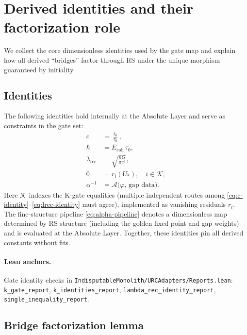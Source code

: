 \documentclass[11pt]{article}
\begin{document}
\section{Derived identities and their factorization role}
We collect the core dimensionless identities used by the gate map and explain how all derived ``bridges'' factor through RS under the unique morphism guaranteed by initiality.

\subsection{Identities}
The following identities hold internally at the Absolute Layer and serve as constraints in the gate set:
\begin{align}
  c &= \frac{\ell_0}{\tau_0}, \label{eq:c-identity} \\
  \hbar &= E_{\mathrm{coh}}\,\tau_0, \label{eq:hbar-identity} \\
  \lambda_{\mathrm{rec}} &= \sqrt{\frac{\hbar G}{\pi c^3}}, \label{eq:lrec-identity} \\
  0 &= r_i(U_*), \quad i\in\mathcal{K}, \label{eq:kgates-zero} \\
  \alpha^{-1} &= \mathcal{A}\bigl(\varphi,\,\text{gap data}\bigr). \label{eq:alpha-pipeline}
\end{align}
Here \(\mathcal{K}\) indexes the K\mbox{-}gate equalities (multiple independent routes among \eqref{eq:c-identity}--\eqref{eq:lrec-identity} must agree), implemented as vanishing residuals \(r_i\). The fine\mbox{-}structure pipeline \eqref{eq:alpha-pipeline} denotes a dimensionless map determined by RS structure (including the golden fixed point and gap weights) and is evaluated at the Absolute Layer. Together, these identities pin all derived constants without fits.

\paragraph{Lean anchors.} Gate identity checks in \texttt{IndisputableMonolith/URCAdapters/Reports.lean}: \texttt{k\_gate\_report}, \texttt{k\_identities\_report}, \texttt{lambda\_rec\_identity\_report}, \texttt{single\_inequality\_report}.

\subsection{Bridge factorization lemma}
\end{document}
